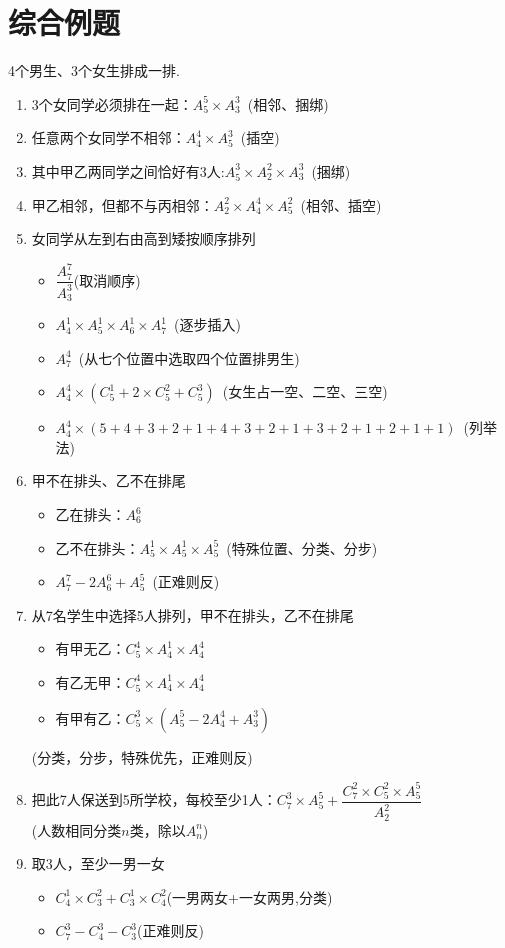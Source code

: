 \documentclass[marginline,noindent,answers,adobefonts]{BHCexam}
\begin{document}
\section{综合例题}
\begin{example}
4个男生、3个女生排成一排.
\begin{enumerate}[1)]
\item 3个女同学必须排在一起：$A_5^5\times A_3^3$~{(\kaishu 相邻、捆绑)}
\item 任意两个女同学不相邻：$A_4^4\times A_5^3$~{(\kaishu 插空)}
\item 其中甲乙两同学之间恰好有$3$人:$A_5^3\times A_2^2\times A^3_3$~{\kaishu (捆绑)}
\item 甲乙相邻，但都不与丙相邻：$A_2^2\times A_4^4\times A_5^2$~{\kaishu (相邻、插空)}
\item 女同学从左到右由高到矮按顺序排列
\begin{itemize}
\item $\dfrac{A^7_7}{A^3_3}${\kaishu(取消顺序)}
\item $A^1_4\times A_5^1\times A_6^1\times A_7^1$~{\kaishu(逐步插入)}
\item $A_7^4$~{\kaishu(从七个位置中选取四个位置排男生)}
\item $ A_4^4\times(C_5^1+2\times C_5^2+C_5^3) $~{\kaishu (女生占一空、二空、三空)}
\item $A_4^4\times (5+4+3+2+1+4+3+2+1+3+2+1+2+1+1)$~{\kaishu(列举法)}
\end{itemize}
\item 甲不在排头、乙不在排尾
\begin{itemize}
\item 乙在排头：$A_6^6$
\item 乙不在排头：$A_5^1\times A_5^1\times A_5^5$~{\kaishu(特殊位置、分类、分步)}
\item $A_7^7-2A_6^6+A_5^5$~{\kaishu(正难则反)} 
\end{itemize}
\item 从7名学生中选择5人排列，甲不在排头，乙不在排尾
\begin{itemize}
\item 有甲无乙：$C_5^4\times A_4^1\times A^4_4$
\item 有乙无甲：$C_5^4\times A_4^1 \times A_4^4$
\item 有甲有乙：$C_5^3\times (A_5^5-2A_4^4+A_3^3)$
\end{itemize}
{\kaishu (分类，分步，特殊优先，正难则反)}
\item 把此7人保送到5所学校，每校至少1人：$ C_7^3\times A^5_5+\dfrac{C_7^2\times C_5^2\times A_5^5}{A_2^2} $~\\{\kaishu(人数相同分类$ n $类，除以$ A_n^n $)}
\item 取3人，至少一男一女
\begin{itemize}
\item $C_4^1\times C_3^2+C_3^1\times C_4^2${\kaishu(一男两女+一女两男,分类)}
\item $C_7^3-C_4^3-C_3^3${\kaishu(正难则反)}
\end{itemize}
\end{enumerate}
\end{example}
%
\end{document}
